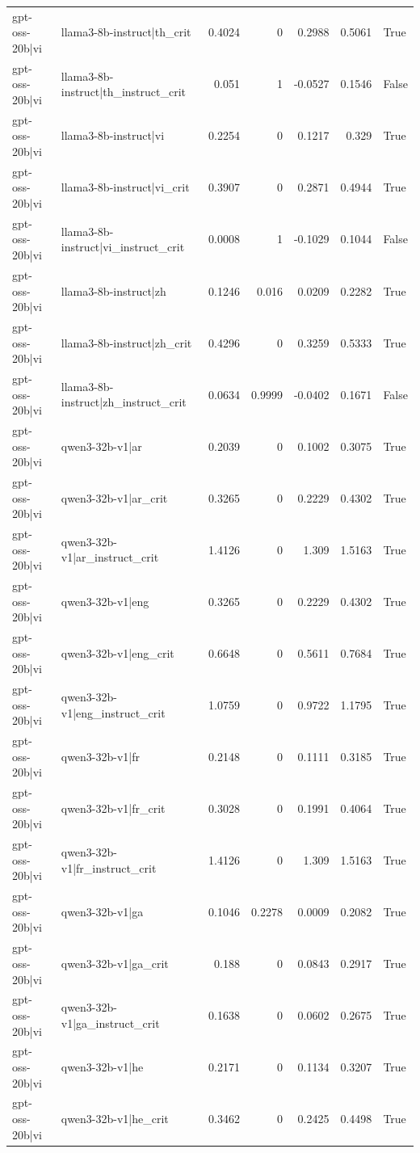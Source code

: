 \begin{table}
\begin{tabular}{l l r r r r l}
gpt-oss-20b|vi & llama3-8b-instruct|th_crit & 0.4024 & 0 & 0.2988 & 0.5061 & True \\
gpt-oss-20b|vi & llama3-8b-instruct|th_instruct_crit & 0.051 & 1 & -0.0527 & 0.1546 & False \\
gpt-oss-20b|vi & llama3-8b-instruct|vi & 0.2254 & 0 & 0.1217 & 0.329 & True \\
gpt-oss-20b|vi & llama3-8b-instruct|vi_crit & 0.3907 & 0 & 0.2871 & 0.4944 & True \\
gpt-oss-20b|vi & llama3-8b-instruct|vi_instruct_crit & 0.0008 & 1 & -0.1029 & 0.1044 & False \\
gpt-oss-20b|vi & llama3-8b-instruct|zh & 0.1246 & 0.016 & 0.0209 & 0.2282 & True \\
gpt-oss-20b|vi & llama3-8b-instruct|zh_crit & 0.4296 & 0 & 0.3259 & 0.5333 & True \\
gpt-oss-20b|vi & llama3-8b-instruct|zh_instruct_crit & 0.0634 & 0.9999 & -0.0402 & 0.1671 & False \\
gpt-oss-20b|vi & qwen3-32b-v1|ar & 0.2039 & 0 & 0.1002 & 0.3075 & True \\
gpt-oss-20b|vi & qwen3-32b-v1|ar_crit & 0.3265 & 0 & 0.2229 & 0.4302 & True \\
gpt-oss-20b|vi & qwen3-32b-v1|ar_instruct_crit & 1.4126 & 0 & 1.309 & 1.5163 & True \\
gpt-oss-20b|vi & qwen3-32b-v1|eng & 0.3265 & 0 & 0.2229 & 0.4302 & True \\
gpt-oss-20b|vi & qwen3-32b-v1|eng_crit & 0.6648 & 0 & 0.5611 & 0.7684 & True \\
gpt-oss-20b|vi & qwen3-32b-v1|eng_instruct_crit & 1.0759 & 0 & 0.9722 & 1.1795 & True \\
gpt-oss-20b|vi & qwen3-32b-v1|fr & 0.2148 & 0 & 0.1111 & 0.3185 & True \\
gpt-oss-20b|vi & qwen3-32b-v1|fr_crit & 0.3028 & 0 & 0.1991 & 0.4064 & True \\
gpt-oss-20b|vi & qwen3-32b-v1|fr_instruct_crit & 1.4126 & 0 & 1.309 & 1.5163 & True \\
gpt-oss-20b|vi & qwen3-32b-v1|ga & 0.1046 & 0.2278 & 0.0009 & 0.2082 & True \\
gpt-oss-20b|vi & qwen3-32b-v1|ga_crit & 0.188 & 0 & 0.0843 & 0.2917 & True \\
gpt-oss-20b|vi & qwen3-32b-v1|ga_instruct_crit & 0.1638 & 0 & 0.0602 & 0.2675 & True \\
gpt-oss-20b|vi & qwen3-32b-v1|he & 0.2171 & 0 & 0.1134 & 0.3207 & True \\
gpt-oss-20b|vi & qwen3-32b-v1|he_crit & 0.3462 & 0 & 0.2425 & 0.4498 & True \\

\end{tabular}
\end{table}
